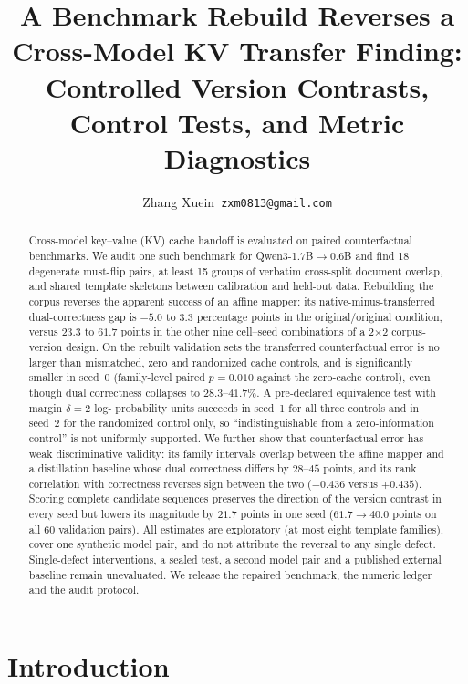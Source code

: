 \documentclass[11pt,twocolumn]{article}
\title{A Benchmark Rebuild Reverses a Cross-Model KV Transfer Finding:
Controlled Version Contrasts, Control Tests, and Metric Diagnostics}
\author{Zhang Xuein~\texttt{zxm0813@gmail.com}}
\date{}
\begin{document}
\maketitle

\begin{abstract}
Cross-model key--value (KV) cache handoff is evaluated on paired counterfactual
benchmarks. We audit one such benchmark for Qwen3-1.7B$\to$0.6B and find 18
degenerate must-flip pairs, at least 15 groups of verbatim cross-split document
overlap, and shared template skeletons between calibration and held-out data.
Rebuilding the corpus reverses the apparent success of an affine mapper: its
native-minus-transferred dual-correctness gap is $-5.0$ to $3.3$ percentage
points in the original/original condition, versus $23.3$ to $61.7$ points in
the other nine cell--seed combinations of a 2$\times$2 corpus-version design.
On the rebuilt validation sets the transferred counterfactual error is no
larger than mismatched, zero and randomized cache controls, and is
significantly smaller in seed~0 (family-level paired $p=0.010$ against the
zero-cache control), even though dual correctness collapses to
$28.3$--$41.7\%$. A pre-declared equivalence test with margin $\delta=2$ log-
probability units succeeds in seed~1 for all three controls and in seed~2 for
the randomized control only, so ``indistinguishable from a zero-information
control'' is not uniformly supported. We further show that counterfactual
error has weak discriminative validity: its family intervals overlap between
the affine mapper and a distillation baseline whose dual correctness differs
by $28$--$45$ points, and its rank correlation with correctness reverses sign
between the two ($-0.436$ versus $+0.435$). Scoring complete candidate
sequences preserves the direction of the version contrast in every seed but
lowers its magnitude by $21.7$ points in one seed ($61.7\to40.0$ points on all
60 validation pairs). All estimates are exploratory (at most eight template
families), cover one synthetic model pair, and do not attribute the reversal
to any single defect. Single-defect interventions, a sealed test, a second
model pair and a published external baseline remain unevaluated. We release
the repaired benchmark, the numeric ledger and the audit protocol.
\end{abstract}

\section{Introduction}
\label{sec:intro}
\end{document}
